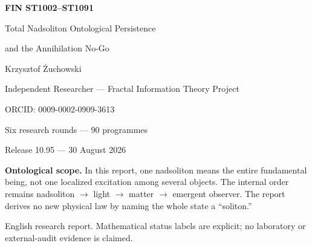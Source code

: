 \documentclass[11pt,a4paper]{article}
\begin{document}
\begin{titlepage}
\centering
\vspace*{16mm}
{\Huge\bfseries FIN ST1002--ST1091\par}
\vspace{5mm}
{\LARGE Total Nadsoliton Ontological Persistence\par}
\vspace{2mm}
{\LARGE and the Annihilation No-Go\par}
\vspace{13mm}
{\Large Krzysztof \.Zuchowski\par}
{\normalsize Independent Researcher --- Fractal Information Theory Project\par}
{\normalsize ORCID: 0009-0002-0909-3613\par}
\vspace{10mm}
{\large Six research rounds --- 90 programmes\par}
{\large Release 10.95 --- 30 August 2026\par}
\vfill
\begin{minipage}{0.86\textwidth}\small
\textbf{Ontological scope.} In this report, one nadsoliton means the entire
fundamental being, not one localized excitation among several objects.  The
internal order remains nadsoliton $\to$ light $\to$ matter $\to$ emergent
observer.  The report derives no new physical law by naming the whole state a
``soliton.''
\end{minipage}
\vfill
{\small English research report.  Mathematical status labels are explicit;
no laboratory or external-audit evidence is claimed.}
\end{titlepage}
\end{document}
